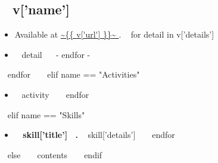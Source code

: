   \subsection{~{{ v['name'] }}~}
    \begin{itemize}
      \item Available at \url{ ~{{ v['url'] }}~ }.
    ~{ for detail in v['details'] }~
      \item ~{{ detail }}~
    ~{- endfor -}~
    \end{itemize}
  ~{ endfor }~
~{ elif name == "Activities" }~
    \begin{itemize}
  ~{ for activity in contents }~
    \item ~{{ activity }}~
  ~{ endfor }~
    \end{itemize}
~{ elif name == "Skills" }~
    \begin{itemize}
  ~{ for skill in contents }~
    \item { \bf ~{{ skill['title'] }}~. } ~{{ skill['details'] }}~
  ~{ endfor }~
    \end{itemize}
~{ else }~
  ~{{ contents }}~
~{ endif }~
